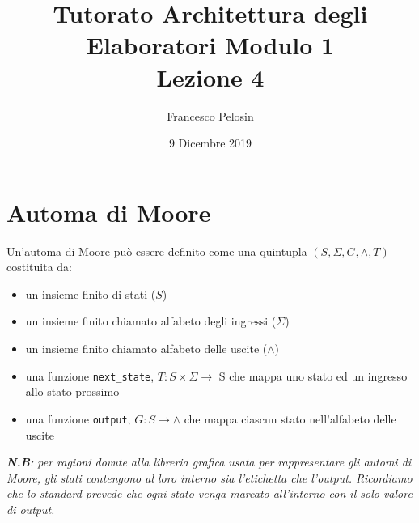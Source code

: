 \documentclass{article}
\title{Tutorato Architettura degli Elaboratori Modulo 1 \\ Lezione 4}
\author{Francesco Pelosin}
\date{9 Dicembre 2019}
\begin{document}
\maketitle

\section{Automa di Moore}
Un'automa di Moore può essere definito come una quintupla $(S, \Sigma, G , \wedge, T)$ costituita da:
\begin{itemize}
    \item un insieme finito di stati ($S$)
    \item un insieme finito chiamato alfabeto degli ingressi ($\Sigma$)
    \item un insieme finito chiamato alfabeto delle uscite ($\wedge$)
    \item una funzione \texttt{next\_state}, $T : S\times \Sigma \rightarrow$ S che mappa uno stato ed un ingresso allo stato prossimo
    \item una funzione \texttt{output}, $G : S \rightarrow \wedge$ che mappa ciascun stato nell'alfabeto delle uscite
\end{itemize}

\textit{\textbf{N.B}: per ragioni dovute alla libreria grafica usata per rappresentare gli automi di Moore, gli stati contengono al loro interno sia l'etichetta che l'output. Ricordiamo che lo standard prevede che ogni stato venga marcato all'interno con il solo valore di output.}
\end{document}
